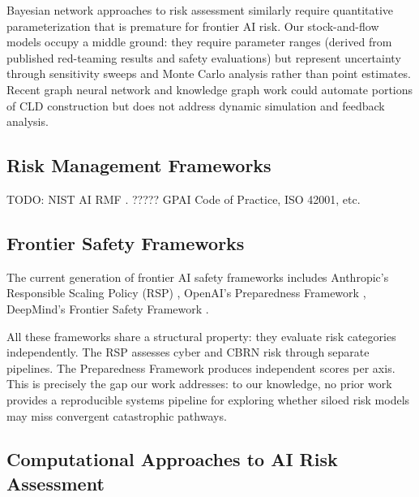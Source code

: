 \documentclass[11pt]{article}
\begin{document}
Bayesian network approaches to risk assessment \citep{fenton2012} similarly require quantitative parameterization that is premature for frontier AI risk. Our stock-and-flow models occupy a middle ground: they require parameter ranges (derived from published red-teaming results and safety evaluations) but represent uncertainty through sensitivity sweeps and Monte Carlo analysis rather than point estimates. Recent graph neural network and knowledge graph work \citep{schlichtkrull2018} could automate portions of CLD construction but does not address dynamic simulation and feedback analysis.

\subsection{Risk Management Frameworks}
TODO: NIST AI RMF \citep{nist2023rmf}. ????? GPAI Code of Practice, ISO 42001, etc. 

\subsection{Frontier Safety Frameworks}

The current generation of frontier AI safety frameworks includes Anthropic's Responsible Scaling Policy (RSP) \citep{anthropic2024rsp}, OpenAI's Preparedness Framework \citep{openai2023preparedness}, DeepMind's Frontier Safety Framework \citep{deepmind2024fsf}. 

All these frameworks share a structural property: they evaluate risk categories independently. The RSP assesses cyber and CBRN risk through separate pipelines. The Preparedness Framework produces independent scores per axis. This is precisely the gap our work addresses: to our knowledge, no prior work provides a reproducible systems pipeline for exploring whether siloed risk models may miss convergent catastrophic pathways.

\subsection{Computational Approaches to AI Risk Assessment}
\end{document}
